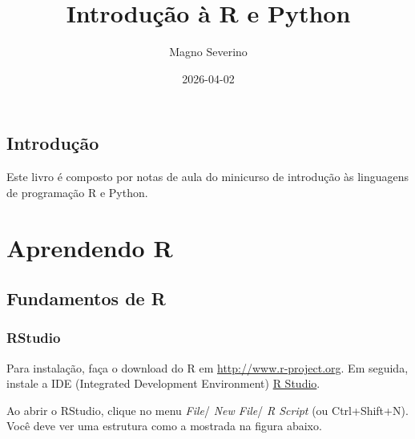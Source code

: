 \documentclass[
  letterpaper,
  DIV=11,
  numbers=noendperiod]{scrreprt}
\title{Introdução à R e Python}
\author{Magno Severino}
\date{2026-04-02}
\renewcommand*\contentsname{Table of contents}
\newcommand\contentsname{Table of contents}
\begin{document}
\maketitle
\ifdefined\Shaded\renewenvironment{Shaded}{\begin{tcolorbox}[breakable, frame hidden, interior hidden, enhanced, borderline west={3pt}{0pt}{shadecolor}, sharp corners, boxrule=0pt]}{\end{tcolorbox}}\fi

\renewcommand*\contentsname{Table of contents}
{
\hypersetup{linkcolor=}
\setcounter{tocdepth}{2}
\tableofcontents
}

\hypertarget{introduuxe7uxe3o}{%
\chapter*{Introdução}\label{introduuxe7uxe3o}}


Este livro é composto por notas de aula do minicurso de introdução às
linguagens de programação R e Python.

\part{Aprendendo R}

\hypertarget{fundamentos-de-r}{%
\chapter{Fundamentos de R}\label{fundamentos-de-r}}

\hypertarget{rstudio}{%
\section{RStudio}\label{rstudio}}

Para instalação, faça o download do R em \url{http://www.r-project.org}.
Em seguida, instale a IDE (Integrated Development Environment)
\href{http://www.rstudio.org}{R Studio}.

Ao abrir o RStudio, clique no menu \emph{File}/ \emph{New File}/ \emph{R
Script} (ou Ctrl+Shift+N). Você deve ver uma estrutura como a mostrada
na figura abaixo.
\end{document}

